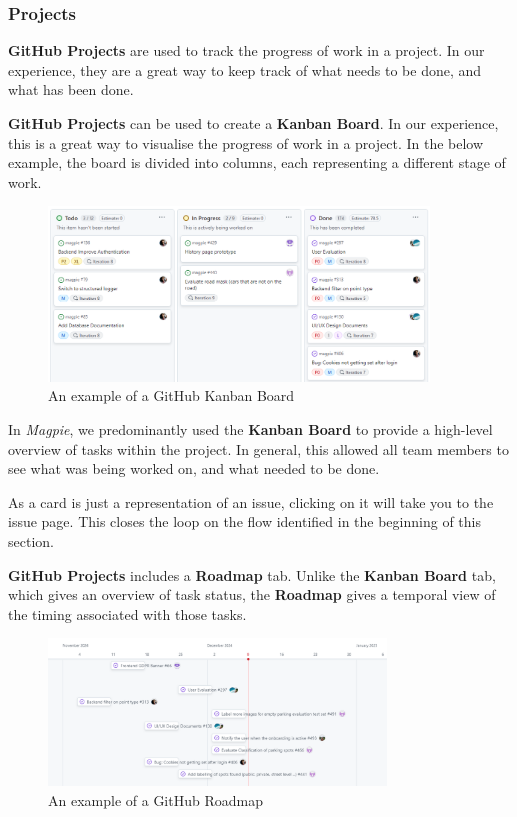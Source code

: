 \documentclass[preview]{standalone}
\begin{document}
\newpage{}

\subsubsection{Projects}
\textbf{GitHub Projects} are used to track the progress of work in a project. In
our experience, they are a great way to keep track of what needs to be done, and
what has been done.

\textbf{GitHub Projects} can be used to create a \textbf{Kanban Board}. In our
experience, this is a great way to visualise the progress of work in a project.
In the below example, the board is divided into columns, each representing a
different stage of work.

\begin{figure}[htbp]
    \centering{}
    \includegraphics[width=0.9\textwidth]{images/github_kanban.png}
    \caption{An example of a GitHub Kanban Board}
\end{figure}

In \textit{Magpie}, we predominantly used the \textbf{Kanban Board} to provide a
high-level overview of tasks within the project. In general, this allowed all
team members to see what was being worked on, and what needed to be done.

As a card is just a representation of an issue, clicking on it will take you to
the issue page. This closes the loop on the flow identified in the beginning of
this section.

\textbf{GitHub Projects} includes a \textbf{Roadmap} tab. Unlike the
\textbf{Kanban Board} tab, which gives an overview of task status, the
\textbf{Roadmap} gives a temporal view of the timing associated with those
tasks.

\begin{figure}[h]
    \centering{}
    \includegraphics[width=0.8\textwidth]{images/github_roadmap.png}
    \caption{An example of a GitHub Roadmap}
\end{figure}
\end{document}
